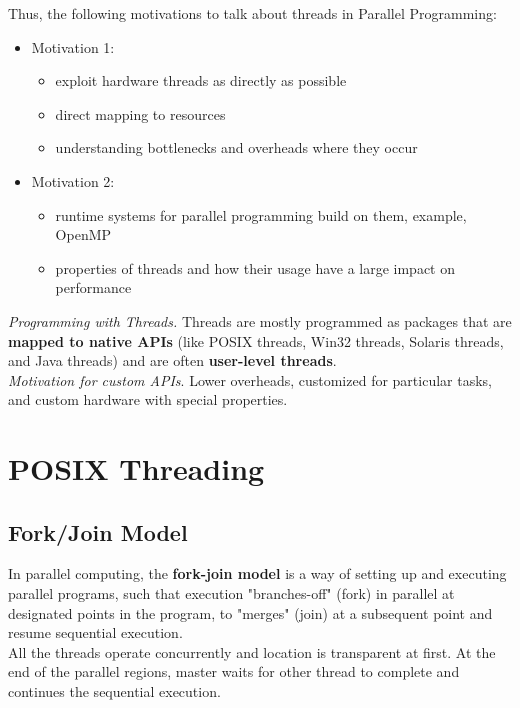 \documentclass[12pt, a4paper]{report}
\begin{document}
Thus, the following motivations to talk about threads in Parallel Programming:
\begin{itemize}
    \item Motivation 1:
            \begin{itemize}
                \item exploit hardware threads as directly as possible
                \item direct mapping to resources
                \item understanding bottlenecks and overheads where they occur
            \end{itemize}
    \item Motivation 2:
            \begin{itemize}
                \item runtime systems for parallel programming build on them, example, OpenMP
                \item properties of threads and how their usage have a large impact on performance
            \end{itemize}
\end{itemize}


{\textit{Programming with Threads.}} Threads are mostly programmed as packages that are {\bfseries{mapped to native APIs}} (like
POSIX threads, Win32 threads, Solaris threads, and Java threads) and are often {\bfseries{user-level threads}}.\\

{\textit{Motivation for custom APIs}}. Lower overheads, customized for particular tasks, and custom hardware with special
properties.

\section{POSIX Threading}
\subsection{Fork/Join Model}
In parallel computing, the {\bfseries{fork-join model}} is a way of setting up and executing parallel programs, such that execution
"branches-off" (fork) in parallel at designated points in the program, to "merges" (join) at a subsequent point and resume
sequential execution.\\
All the threads operate concurrently and location is transparent at first. At the end of the parallel regions, master waits for other
thread to complete and continues the sequential execution. 
\end{document}
